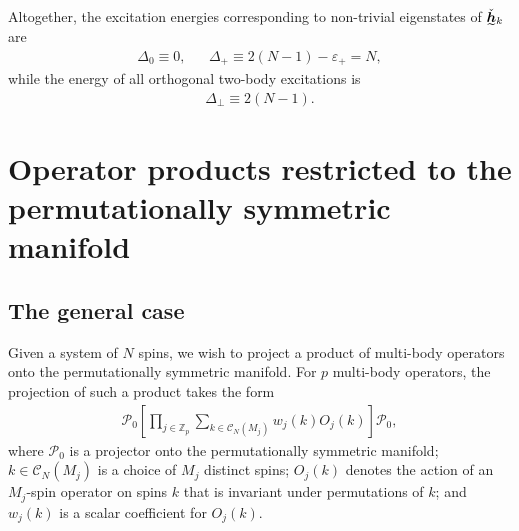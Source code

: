 \documentclass[nofootinbib,notitlepage,11pt]{revtex4-2}
\newcommand{\p}[1]{\left(#1\right)} %
\renewcommand{\sp}[1]{\left[#1\right]} %
\newcommand{\m}{\bm} %
\newcommand{\1}{\mathds{1}}
\newcommand{\C}{\mathcal{C}}
\renewcommand{\P}{\mathcal{P}}
\newcommand{\ZZ}{\mathbb{Z}}
\newcommand{\ut}{\undertilde}
\begin{document}
Altogether, the excitation energies corresponding to non-trivial
eigenstates of $\ut{\check{\m h}}_k$ are
\begin{align}
  \Delta_0 \equiv 0,
  &&
  \Delta_+ \equiv 2\p{N-1} - \varepsilon_+ = N,
\end{align}
while the energy of all orthogonal two-body excitations is
\begin{align}
  \Delta_\perp \equiv 2\p{N-1}.
\end{align}

\section{Operator products restricted to the permutationally symmetric
  manifold}
\label{sec:sym_prod}

\subsection{The general case}

Given a system of $N$ spins, we wish to project a product of
multi-body operators onto the permutationally symmetric manifold.  For
$p$ multi-body operators, the projection of such a product takes the
form
\begin{align}
  \P_0 \sp{\prod_{j\in\ZZ_p}
    \sum_{k\in\C_N\p{M_j}} w_j\p{k} O_j\p{k}} \P_0,
  \label{eq:sym_prod_proj}
\end{align}
where $\P_0$ is a projector onto the permutationally symmetric
manifold; $k\in\C_N\p{M_j}$ is a choice of $M_j$ distinct spins;
$O_j\p{k}$ denotes the action of an $M_j$-spin operator on spins $k$
that is invariant under permutations of $k$; and $w_j\p{k}$ is a
scalar coefficient for $O_j\p{k}$.
\end{document}
